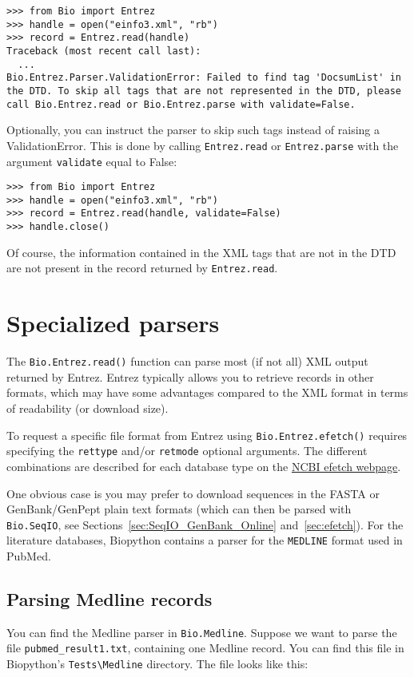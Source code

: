 \begin{verbatim}
>>> from Bio import Entrez
>>> handle = open("einfo3.xml", "rb")
>>> record = Entrez.read(handle)
Traceback (most recent call last):
  ...
Bio.Entrez.Parser.ValidationError: Failed to find tag 'DocsumList' in the DTD. To skip all tags that are not represented in the DTD, please call Bio.Entrez.read or Bio.Entrez.parse with validate=False.
\end{verbatim}
Optionally, you can instruct the parser to skip such tags instead of raising a ValidationError. This is done by calling \verb|Entrez.read| or \verb|Entrez.parse| with the argument \verb|validate| equal to False:

\begin{verbatim}
>>> from Bio import Entrez
>>> handle = open("einfo3.xml", "rb")
>>> record = Entrez.read(handle, validate=False)
>>> handle.close()
\end{verbatim}
Of course, the information contained in the XML tags that are not in the DTD are not present in the record returned by \verb|Entrez.read|.


\section{Specialized parsers}
\label{sec:entrez-specialized-parsers}

The \verb|Bio.Entrez.read()| function can parse most (if not all) XML output returned by Entrez. Entrez typically allows you to retrieve records in other formats, which may have some advantages compared to the XML format in terms of readability (or download size).

To request a specific file format from Entrez using \verb|Bio.Entrez.efetch()| requires specifying the \verb|rettype| and/or \verb|retmode| optional arguments.  The different combinations are described for each database type on the \href{https://www.ncbi.nlm.nih.gov/books/NBK25499/#chapter4.EFetch}{NCBI efetch webpage}.

One obvious case is you may prefer to download sequences in the FASTA or GenBank/GenPept plain text formats (which can then be parsed with \verb|Bio.SeqIO|, see Sections~\ref{sec:SeqIO_GenBank_Online} and~\ref{sec:efetch}).  For the literature databases, Biopython contains a parser for the \verb+MEDLINE+ format used in PubMed.

\subsection{Parsing Medline records}
\label{sec:entrez-and-medline}
You can find the Medline parser in \verb+Bio.Medline+. Suppose we want to parse the file \verb+pubmed_result1.txt+, containing one Medline record. You can find this file in Biopython's \verb+Tests\Medline+ directory. The file looks like this:

